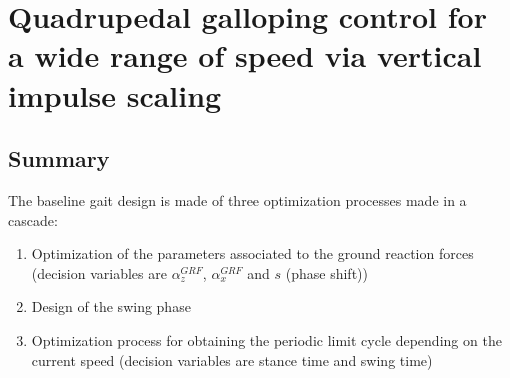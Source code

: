 \section{Quadrupedal galloping control for a wide range of speed via vertical impulse scaling}

\subsection*{Summary}
The baseline gait design is made of three optimization processes made in a cascade:
\begin{enumerate}
\item Optimization of the parameters associated to the ground reaction forces (decision variables are $\alpha^{GRF}_z$, $\alpha^{GRF}_x$ and $s$ (phase shift))
\item Design of the swing phase
\item Optimization process for obtaining the periodic limit cycle depending on the current speed (decision variables are stance time and swing time)
\end{enumerate}